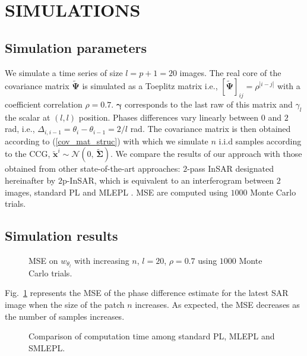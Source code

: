 \vspace{-5pt} 
\section{SIMULATIONS}
\vspace{-5pt} 
\label{sec:simulations}
\subsection{Simulation parameters}
We simulate a time series of size $l = p+1 = 20$ images. The real core of the covariance matrix  $\mathbf{\tilde{\Psi}}$ is simulated as a Toeplitz matrix i.e.,  $[ \mathbf{\tilde{\Psi}}]_{ij} = \rho^{|i-j|}$ with a coefficient correlation $\rho = 0.7$. $\boldsymbol{\gamma}$ corresponds to the last raw of this matrix and $\gamma_l$ the scalar at $(l, l)$ position. Phases differences vary linearly between $0$ and $2$ rad, i.e., $\Delta_{i, i-1} = \theta_i - \theta_{i-1} = 2/l$ rad.  The covariance matrix is then obtained according to (\ref{cov_mat_struc}) with which we simulate $n$ \ac{i.i.d} samples according to the \acs{CCG}, $\mathbf{\tilde{x}}^i \sim \mathcal{N}(0,\, \mathbf{\tilde{\Sigma}})$. 
We compare the results of our approach with those obtained from other state-of-the-art approaches: $2$-pass \acs{InSAR} designated hereinafter by $2$p-InSAR, which is equivalent to an interferogram between $2$ images, standard \acs{PL} \citep{cao2015mathematical} and \ac{MLEPL} \citep{vu2022new}. \ac{MSE} are computed using $1000$ Monte Carlo trials.
\vspace{-5pt} 
\subsection{Simulation results}
\begin{figure}[ht]
  \centering
  \centerline{}
\vspace{-0.5cm}
  \caption{\small \acs{MSE} on $w_{\theta_{l}}$ with increasing $n$, $l = 20$, $\rho=0.7$ using $1000$ Monte Carlo trials.}
\label{fig:MSE-Gaussian}
\end{figure}
Fig.~\ref{fig:MSE-Gaussian} represents the \acs{MSE} of the phase difference estimate for the latest \acs{SAR} image when the size of the patch $n$ increases. As expected, the \acs{MSE} decreases as the number of samples increases. 
\begin{figure}[ht]
  \centering
  \centerline{}
  \caption{\small Comparison of computation time among standard \acs{PL}, \ac{MLEPL} and \ac{SMLEPL}.}
\label{fig:computation_time}
\end{figure}

